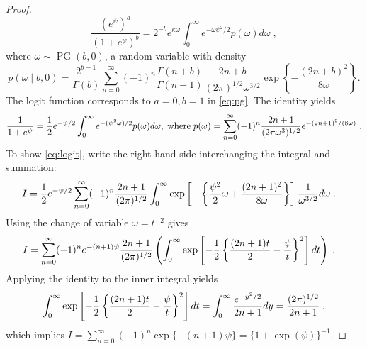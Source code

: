 \documentclass[bj]{imsart}
\begin{document}
\begin{proof}
\begin{equation}
  \frac{(e^{\psi})^a}{(1+e^{\psi})^b} = 2^{-b} e^{\kappa \omega} 
  \int_0^{\infty} e^{-\omega \psi^2/2} p(\omega) d\omega
  \;, 
  \label{eq:pg}
\end{equation}
where $\omega \sim \operatorname{PG}(b,0)$, a \PG{} random variable with density
\[
p(\omega \mid b, 0) = \frac{2^{b-1}}{\Gamma(b)} \sum_{n=0}^{\infty} (-1)^n \frac{\Gamma(n+b)}{\Gamma(n+1)} \frac{2n + b}{(2 \pi)^{1/2} \omega^{3/2}} 
\exp\left\{-\frac{(2 n + b)^2}{8 \omega} \right\}.
\]
The logit function corresponds to $a=0,b=1$ in \eqref{eq:pg}. The \CS{} identity yields
\begin{equation}
  \frac{1}{1+e^{\psi}} = \frac{1}{2} e^{- \psi/2} \int_0^{\infty} e^{-(\psi^2\omega)/2} p(\omega) d\omega, \; \mbox{where} \; p(\omega) = \sum_{n=0}^{\infty} (-1)^n \frac{2n+1}{ (2 \pi \omega^3)^{1/2}} e^{-(2n+1)^2/(8 \omega)}
  \label{eq:logit}\;.
\end{equation}
To show \eqref{eq:logit}, write the right-hand side interchanging the integral and summation:
\begin{align*}
  I & = \frac{1}{2} e^{-\psi/2} \sum_{n=0}^{\infty} (-1)^n \frac{2n+1}{(2 \pi)^{1/2}}  \int_0^{\infty} \exp\left[-\left\{ \frac{\psi^2}{2} \omega + \frac{(2n+1)^2}{8 \omega} \right\} \right] \frac{1}{\omega^{3/2}} d\omega \;. 
\end{align*}
Using the change of variable $\omega = t^{-2}$ gives
\begin{align*}
  I & = \sum_{n=0}^{\infty} (-1)^n e^{-(n+1)\psi} 
  \frac{2n + 1}{(2 \pi)^{1/2}} 
  \left( \int_{0}^{\infty} 
    \exp\left[-\frac{1}{2} \left\{ \frac{(2n+1)t}{2} - \frac{\psi}{t}\right\}^2 \right] dt 
  \right)
  \;.
\end{align*}
Applying the \CS{} identity to the inner integral yields 
\[
\int_{0}^{\infty} 
\exp\left[-\frac{1}{2} \left\{ \frac{(2n+1)t}{2} - \frac{\psi}{t}\right \}^2 \right] dt 
= \int_0^{\infty} \frac{e^{-y^2/2}}{2n+1} dy= \frac{(2\pi)^{1/2}}{2n+1}
\;,
\]
which implies $I = \sum_{n=0}^{\infty} (-1)^n \exp\{-(n+1) \psi\} = \{1+\exp(\psi)\}^{-1}$. 
\end{proof}
\end{document}
